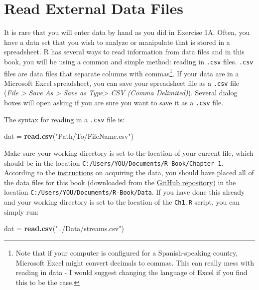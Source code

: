 \documentclass[]{book}
\newenvironment{Shaded}{\begin{snugshade}}{\end{snugshade}}
\newcommand{\KeywordTok}[1]{\textcolor[rgb]{0.13,0.29,0.53}{\textbf{#1}}}
\newcommand{\StringTok}[1]{\textcolor[rgb]{0.31,0.60,0.02}{#1}}
\newcommand{\NormalTok}[1]{#1}
\let\rmarkdownfootnote\footnote%
\def\footnote{\protect\rmarkdownfootnote}
\theoremstyle{definition}
\theoremstyle{definition}
\theoremstyle{definition}
\theoremstyle{remark}
\begin{document}
\section{Read External Data Files}\label{read}

It is rare that you will enter data by hand as you did in Exercise 1A.
Often, you have a data set that you wish to analyze or manipulate that
is stored in a spreadsheet. R has several ways to read information from
data files and in this book, you will be using a common and simple
method: reading in \texttt{.csv} files. \texttt{.csv} files are data
files that separate columns with commas\footnote{Note that if your
  computer is configured for a Spanish-speaking country, Microsoft Excel
  might convert decimals to commas. This can really mess with reading in
  data - I would suggest changing the language of Excel if you find this
  to be the case.}. If your data are in a Microsoft Excel spreadsheet,
you can save your spreadsheet file as a \texttt{.csv} file (\emph{File
\textgreater{} Save As \textgreater{} Save as Type\textgreater{} CSV
(Comma Delimited)}). Several dialog boxes will open asking if you are
sure you want to save it as a \texttt{.csv} file.

The syntax for reading in a \texttt{.csv} file is:

\begin{Shaded}
\begin{Highlighting}[]
\NormalTok{dat =}\StringTok{ }\KeywordTok{read.csv}\NormalTok{(}\StringTok{"Path/To/FileName.csv"}\NormalTok{)}
\end{Highlighting}
\end{Shaded}

Make sure your working directory is set to the location of your current
file, which should be in the location
\texttt{C:/Users/YOU/Documents/R-Book/Chapter\ 1}. According to the
\protect\hyperlink{data-sets}{instructions} on acquiring the data, you
should have placed all of the data files for this book (downloaded from
the \href{}{GitHub repository}) in the location
\texttt{C:/Users/YOU/Documents/R-Book/Data}. If you have done this
already and your working directory is set to the location of the
\texttt{Ch1.R} script, you can simply run:

\begin{Shaded}
\begin{Highlighting}[]
\NormalTok{dat =}\StringTok{ }\KeywordTok{read.csv}\NormalTok{(}\StringTok{"../Data/streams.csv"}\NormalTok{)}
\end{Highlighting}
\end{Shaded}
\end{document}
